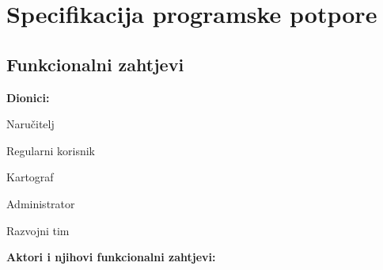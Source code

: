 \chapter{Specifikacija programske potpore}
		
	\section{Funkcionalni zahtjevi}

			\noindent \textbf{Dionici:}
			
			\begin{packed_enum}
				\item Naručitelj
				\item Regularni korisnik		
				\item Kartograf
				\item Administrator
		        \item Razvojni tim
				
			\end{packed_enum}
			
			\noindent \textbf{Aktori i njihovi funkcionalni zahtjevi:}
			
